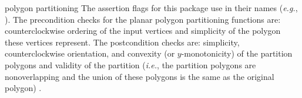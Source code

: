 
\begin{ccPackage}{polygon partitioning}
The assertion flags for this package use  in their names
({\em e.g.}, ).
The precondition checks for the planar polygon partitioning functions
are:  counterclockwise ordering of the input vertices and simplicity of the 
polygon these vertices represent.
The postcondition checks are:  simplicity, counterclockwise orientation,
and convexity (or $y$-monotonicity) of the partition polygons
and validity of the partition ({\em i.e.}, the partition polygons are 
nonoverlapping and the union of these polygons is the same as the
original polygon)
.
\end{ccPackage}

